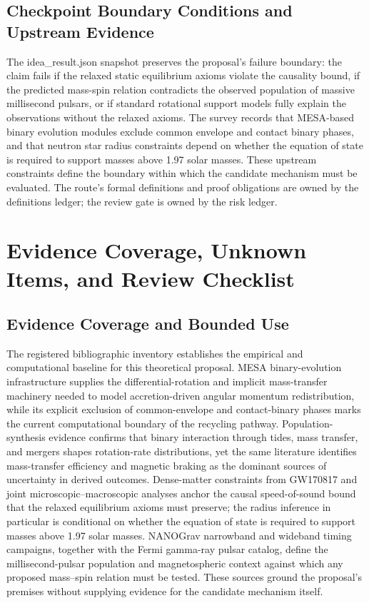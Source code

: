 \documentclass[conference]{IEEEtran}
\begin{document}
\subsection{Checkpoint Boundary Conditions and Upstream Evidence}
The idea\_result.json snapshot preserves the proposal's failure boundary: the claim fails if the relaxed static equilibrium axioms violate the causality bound, if the predicted mass-spin relation contradicts the observed population of massive millisecond pulsars, or if standard rotational support models fully explain the observations without the relaxed axioms. The survey records that MESA-based binary evolution modules exclude common envelope and contact binary phases, and that neutron star radius constraints depend on whether the equation of state is required to support masses above 1.97 solar masses. These upstream constraints define the boundary within which the candidate mechanism must be evaluated. The route's formal definitions and proof obligations are owned by the definitions ledger; the review gate is owned by the risk ledger.~\cite{cite_42e341ff6471ce89,cite_c369df652181e8f7}

\section{Evidence Coverage, Unknown Items, and Review Checklist}
\subsection{Evidence Coverage and Bounded Use}
The registered bibliographic inventory establishes the empirical and computational baseline for this theoretical proposal. MESA binary-evolution infrastructure supplies the differential-rotation and implicit mass-transfer machinery needed to model accretion-driven angular momentum redistribution, while its explicit exclusion of common-envelope and contact-binary phases marks the current computational boundary of the recycling pathway. Population-synthesis evidence confirms that binary interaction through tides, mass transfer, and mergers shapes rotation-rate distributions, yet the same literature identifies mass-transfer efficiency and magnetic braking as the dominant sources of uncertainty in derived outcomes. Dense-matter constraints from GW170817 and joint microscopic--macroscopic analyses anchor the causal speed-of-sound bound that the relaxed equilibrium axioms must preserve; the radius inference in particular is conditional on whether the equation of state is required to support masses above 1.97 solar masses. NANOGrav narrowband and wideband timing campaigns, together with the Fermi gamma-ray pulsar catalog, define the millisecond-pulsar population and magnetospheric context against which any proposed mass--spin relation must be tested. These sources ground the proposal's premises without supplying evidence for the candidate mechanism itself.~\cite{cite_1e5d552669fc0c56,cite_42e341ff6471ce89,cite_55957f4ce67bd972,cite_6c11517977d0b39d,cite_81b31d0d8218f9b8,cite_8609757b321d8ce0,cite_8d1e9c1794df440d,cite_c369df652181e8f7,cite_fd6df2b02dbddc60}
\end{document}
